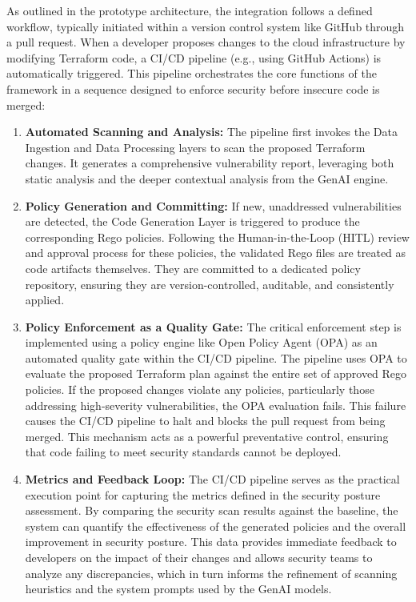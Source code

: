 As outlined in the prototype architecture, the integration follows a defined workflow, typically initiated within a version control system like GitHub through a pull request. When a developer proposes changes to the cloud infrastructure by modifying Terraform code, a CI/CD pipeline (e.g., using GitHub Actions) is automatically triggered. This pipeline orchestrates the core functions of the framework in a sequence designed to enforce security before insecure code is merged:

\begin{enumerate}
    \item \textbf{Automated Scanning and Analysis:} The pipeline first invokes the Data Ingestion and Data Processing layers to scan the proposed Terraform changes. It generates a comprehensive vulnerability report, leveraging both static analysis and the deeper contextual analysis from the GenAI engine.

    \item \textbf{Policy Generation and Committing:} If new, unaddressed vulnerabilities are detected, the Code Generation Layer is triggered to produce the corresponding Rego policies. Following the Human-in-the-Loop (HITL) review and approval process for these policies, the validated Rego files are treated as code artifacts themselves. They are committed to a dedicated policy repository, ensuring they are version-controlled, auditable, and consistently applied.

    \item \textbf{Policy Enforcement as a Quality Gate:} The critical enforcement step is implemented using a policy engine like Open Policy Agent (OPA) as an automated quality gate within the CI/CD pipeline. The pipeline uses OPA to evaluate the proposed Terraform plan against the entire set of approved Rego policies. If the proposed changes violate any policies, particularly those addressing high-severity vulnerabilities, the OPA evaluation fails. This failure causes the CI/CD pipeline to halt and blocks the pull request from being merged. This mechanism acts as a powerful preventative control, ensuring that code failing to meet security standards cannot be deployed.

    \item \textbf{Metrics and Feedback Loop:} The CI/CD pipeline serves as the practical execution point for capturing the metrics defined in the security posture assessment. By comparing the security scan results against the baseline, the system can quantify the effectiveness of the generated policies and the overall improvement in security posture. This data provides immediate feedback to developers on the impact of their changes and allows security teams to analyze any discrepancies, which in turn informs the refinement of scanning heuristics and the system prompts used by the GenAI models.
\end{enumerate}

